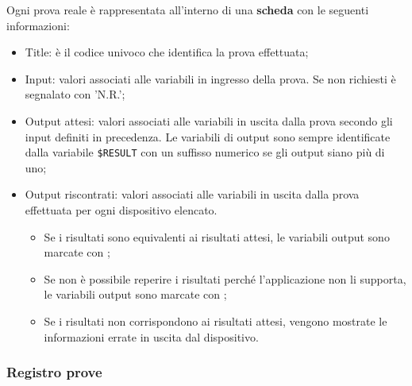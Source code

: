 \documentclass[../../SperimentazioniPratiche.tex]{subfiles}
\begin{document}
			Ogni prova reale è rappresentata all'interno di una \textbf{scheda} con le seguenti informazioni:
			\begin{itemize}
				\item Title: è il codice univoco che identifica la prova effettuata;
				\item Input: valori associati alle variabili in ingresso della prova. Se non richiesti è segnalato con 'N.R.';
				\item Output attesi: valori associati alle variabili in uscita dalla prova secondo gli input definiti in precedenza. Le variabili di output sono sempre identificate dalla variabile \verb|$RESULT| con un suffisso numerico se gli output siano più di uno;
				\item Output riscontrati: valori associati alle variabili in uscita dalla prova effettuata per ogni dispositivo elencato. 
				\begin{itemize}
					\item Se i risultati sono equivalenti ai risultati attesi, le variabili output sono marcate con \ok;
					\item Se non è possibile reperire i risultati perché l'applicazione non li supporta, le variabili output sono marcate con \ns;
					\item Se i risultati non corrispondono ai risultati attesi, vengono mostrate le informazioni errate in uscita dal dispositivo.
				\end{itemize}
			\end{itemize}
			
		
			
		\subsubsection{Registro prove}
		
\end{document}
